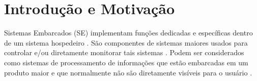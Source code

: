 \documentclass[tese-proposta,nocipinfo]{texufpel}
\begin{document}

\chapter{Introdução e Motivação}
Sistemas Embarcados (SE) implementam funções dedicadas e específicas dentro de um sistema hospedeiro \cite{Camposano1996}. São componentes de sistemas maiores usados para controlar e/ou diretamente monitorar tais sistemas \cite{Guessi:2012:ArchitecturalDescription}. Podem ser considerados como sistemas de processamento de informações que estão embarcadas em um produto maior e que normalmente não são diretamente visíveis para o usuário \cite{marwedel2006embedded}.
\end{document}
